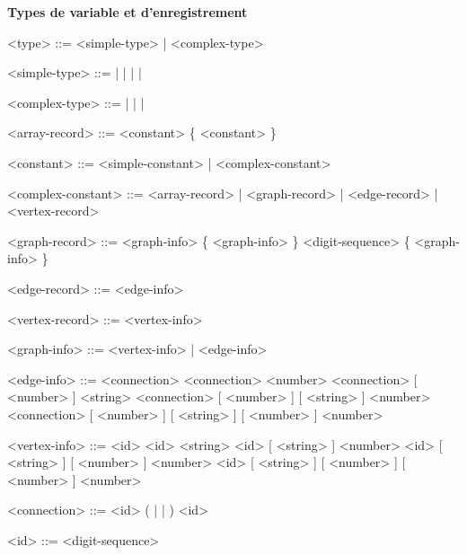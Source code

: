 \documentclass[french]{article}
\begin{document}
				\textbf{Types de variable et d'enregistrement}
				\begin{grammar}
					<type> ::= <simple-type> | <complex-type>
					
					<simple-type> ::=  |  |  |  | 
					
					<complex-type> ::=  |  |  | 
					
					<array-record> ::= \lit{[} <constant> \{ \lit{,} <constant> \} \lit{]}
					
					<constant> ::= <simple-constant> | <complex-constant>
					
					<complex-constant> ::= <array-record> | <graph-record> | <edge-record> | <vertex-record>
					
					<graph-record> ::= \lit{\{} <graph-info> \{ \lit{,} <graph-info> \} \lit{\}}
					\alt \lit{\{} \lit{\#} <digit-sequence> \{ \lit{,} <graph-info> \} \lit{\}}
					
					<edge-record> ::= \lit{(} <edge-info> \lit{)}
					
					<vertex-record> ::=  \lit{)}
					
					<graph-info> ::= <vertex-info> | <edge-info>
					
					<edge-info> ::= <connection> 
					\alt <connection> \lit{:} <number>
					\alt <connection> \lit{:} [ <number> ] \lit{:} <string>
					\alt <connection> \lit{:} [ <number> ] \lit{:} [ <string> ] \lit{:} <number>
					\alt <connection> \lit{:} [ <number> ] \lit{:} [ <string> ] \lit{:} [ <number> ] \lit{:} <number>
					
					<vertex-info> ::= <id> 
					\alt <id> \lit{:} <string>
					\alt <id> \lit{:} [ <string> ] \lit{:} <number>
					\alt <id> \lit{:} [ <string> ] \lit{:} [ <number> ] \lit{:} <number>
					\alt <id> \lit{:} [ <string> ] \lit{:} [ <number> ] \lit{:} [ <number> ] \lit{:} <number>
					
					<connection> ::= <id> ( \lit{\textendash\textemdash} | \lit{\textemdash\textgreater} | \lit{\textless\textemdash} ) <id>
					
					<id> ::= <digit-sequence>
				\end{grammar}
				
\end{document}
